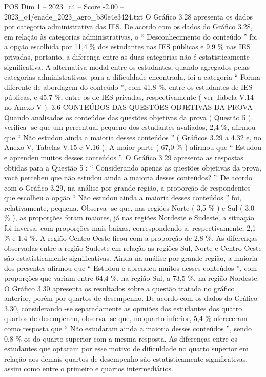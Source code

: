\begin{textsample}{POS Dim 1 – 2023\_c4 – Score -2.00 – 2023\_c4/enade\_2023\_agro\_b30e4e3424.txt}
O Gráfico 3.28 apresenta os dados por categoria administrativa das IES.
De acordo com os dados do Gráfico 3.28, em relação às categorias administrativas, o “ Desconhecimento do conteúdo ” foi a opção escolhida por 11,4 \% dos estudantes nas IES públicas e 9,9 \% nas IES privadas, portanto, a diferença entre as duas categorias não é estatisticamente significativa.
A alternativa modal entre os estudantes, quando agregados pelas categorias administrativas, para a dificuldade encontrada, foi a categoria “ Forma diferente de abordagem do conteúdo ”, com 41,8 \%, entre os estudantes de IES públicas, e 45,7 \%, entre os de IES privadas, respectivamente ( ver Tabela V.14 no Anexo V ). 3.6 CONTEÚDOS DAS QUESTÕES OBJETIVAS DA PROVA Quando analisados os conteúdos das questões objetivas da prova ( Questão 5 ), verifica -se que um percentual pequeno dos estudantes avaliados, 2,4 \%, afirmou que “ Não estudou ainda a maioria desses conteúdos ” ( Gráficos 3.29 a 4.32 e, no Anexo V, Tabelas V.15 e V.16 ).
A maior parte ( 67,0 \% ) afirmou que “ Estudou e aprendeu muitos desses conteúdos ”.
O Gráfico 3.29 apresenta as respostas obtidas para a Questão 5 : “ Considerando apenas as questões objetivas da prova, você percebeu que não estudou ainda a maioria desses conteúdos? ”.
De acordo com o Gráfico 3.29, na análise por grande região, a proporção de respondentes que escolheu a opção “ Não estudou ainda a maioria desses conteúdos ” foi, relativamente, pequena.
Observa -se que, nas regiões Norte ( 3,5 \% ) e Sul ( 3,0 \% ), as proporções foram maiores, já nas regiões Nordeste e Sudeste, a situação foi inversa, com proporções mais baixas, correspondendo a, respectivamente, 2,1 \% e 1,4 \%.
A região Centro-Oeste ficou com a proporção de 2,8 \%.
As diferenças observadas entre a região Sudeste em relação as regiões Sul, Norte e Centro-Oeste são estatisticamente significativas.
Ainda na análise por grande região, a maioria dos presentes afirmou que “ Estudou e aprendeu muitos desses conteúdos ”, com proporções que variam entre 64,4 \%, na região Sul, a 73,5 \%, na região Nordeste.
O Gráfico 3.30 apresenta os resultados sobre a questão tratada no gráfico anterior, porém por quartos de desempenho.
De acordo com os dados do Gráfico 3.30, considerando -se separadamente as opiniões dos estudantes dos quatro quartos de desempenho, observa -se que, no quarto inferior, 5,4 \% ofereceram como resposta que “ Não estudaram ainda a maioria desses conteúdos ”, sendo 0,8 \% os do quarto superior com a mesma resposta.
As diferenças entre os estudantes que optaram por esse motivo de dificuldade no quarto superior em relação aos demais quartos de desempenho são estatisticamente significativas, assim como entre o primeiro e quartos intermediários.

\end{textsample}
